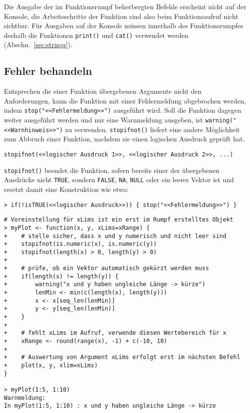 Die Ausgabe der im Funktionsrumpf beherbergten Befehle erscheint nicht auf der Konsole, die Arbeitsschritte der Funktion sind also beim Funktionsaufruf nicht sichtbar. Für Ausgaben auf der Konsole müssen innerhalb des Funktionsrumpfes deshalb die Funktionen \lstinline!print()! und \lstinline!cat()! verwendet werden (Abschn.\ \ref{sec:strings}).

\subsection{Fehler behandeln}
\label{sec:errorHandling}

Entsprechen die einer Funktion übergebenen Argumente nicht den Anforderungen, kann die Funktion mit einer Fehlermeldung abgebrochen werden, indem  \lstinline!stop("<<Fehlermeldung>>")! ausgeführt wird. Soll die Funktion dagegen weiter ausgeführt werden und nur eine Warnmeldung ausgeben, ist  \lstinline!warning("<<Warnhinweis>>")! zu verwenden. \lstinline!stopifnot()! liefert eine andere Möglichkeit zum Abbruch einer Funktion, nachdem sie einen logischen Ausdruck geprüft hat.
\begin{lstlisting}
stopifnot(<<logischer Ausdruck 1>>, <<logischer Ausdruck 2>>, ...)
\end{lstlisting}

\lstinline!stopifnot()! beendet die Funktion, sofern bereits einer der übergebenen Ausdrücke nicht \lstinline!TRUE!, sondern \lstinline!FALSE!, \lstinline!NA!, \lstinline!NULL! oder ein leerer Vektor ist und ersetzt damit eine Konstruktion wie etwa:
\begin{lstlisting}
> if(!isTRUE(<<logischer Ausdruck>>)) { stop("<<Fehlermeldung>>") }
\end{lstlisting}

\begin{lstlisting}
# Voreinstellung für xLims ist ein erst im Rumpf erstelltes Objekt
> myPlot <- function(x, y, xLims=xRange) {
+    # stelle sicher, dass x und y numerisch und nicht leer sind
+    stopifnot(is.numeric(x), is.numeric(y))
+    stopifnot(length(x) > 0, length(y) > 0)
+
+    # prüfe, ob ein Vektor automatisch gekürzt werden muss
+    if(length(x) != length(y)) {
+        warning("x und y haben ungleiche Länge -> kürze")
+        lenMin <- min(c(length(x), length(y)))
+        x <- x[seq_len(lenMin)]
+        y <- y[seq_len(lenMin)]
+    }
+
+    # fehlt xLims im Aufruf, verwende diesen Wertebereich für x
+    xRange <- round(range(x), -1) + c(-10, 10)
+
+    # Auswertung von Argument xLims erfolgt erst im nächsten Befehl
+    plot(x, y, xlim=xLims)
}

> myPlot(1:5, 1:10)
Warnmeldung:
In myPlot(1:5, 1:10) : x und y haben ungleiche Länge -> kürze
\end{lstlisting}

